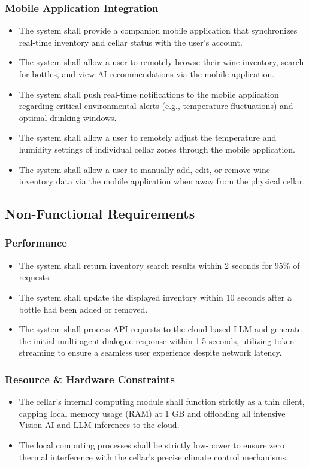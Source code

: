 \documentclass[conference]{IEEEtran}
\begin{document}
\subsubsection{Mobile Application Integration}
\begin{itemize}
    \item The system shall provide a companion mobile application that synchronizes real-time inventory and cellar status with the user's account.
    \item The system shall allow a user to remotely browse their wine inventory, search for bottles, and view AI recommendations via the mobile application.
    \item The system shall push real-time notifications to the mobile application regarding critical environmental alerts (e.g., temperature fluctuations) and optimal drinking windows.
    \item The system shall allow a user to remotely adjust the temperature and humidity settings of individual cellar zones through the mobile application.
    \item The system shall allow a user to manually add, edit, or remove wine inventory data via the mobile application when away from the physical cellar.
\end{itemize}

\subsection{Non-Functional Requirements}

\subsubsection{Performance}
\begin{itemize}
    \item The system shall return inventory search results within 2 seconds for 95\% of requests.
    \item The system shall update the displayed inventory within 10 seconds after a bottle had been added or removed.
    \item The system shall process API requests to the cloud-based LLM and generate the initial multi-agent dialogue response within 1.5 seconds, utilizing token streaming to ensure a seamless user experience despite network latency.
\end{itemize}

\subsubsection{Resource \& Hardware Constraints}
\begin{itemize}
    \item The cellar's internal computing module shall function strictly as a thin client, capping local memory usage (RAM) at 1 GB and offloading all intensive Vision AI and LLM inferences to the cloud.
    \item The local computing processes shall be strictly low-power to ensure zero thermal interference with the cellar's precise climate control mechanisms.
\end{itemize}
\end{document}
